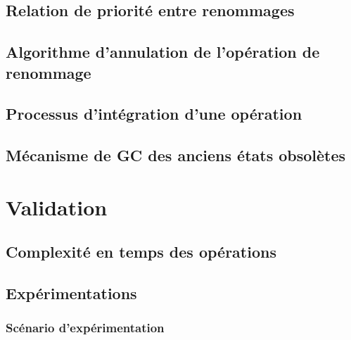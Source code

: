 \subsection{Relation de priorité entre renommages}


\subsection{Algorithme d'annulation de l'opération de renommage}


\subsection{Processus d'intégration d'une opération}


\subsection{Mécanisme de \acl{GC} des anciens états obsolètes}


\section{Validation}


\subsection{Complexité en temps des opérations}


\subsection{Expérimentations}


\subsubsection{Scénario d'expérimentation}


